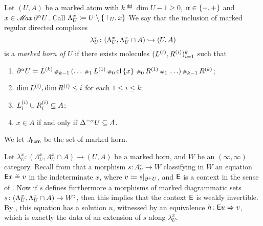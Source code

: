 \begin{dfn} 
    Let \( (U, A) \) be a marked atom with \( k \eqdef \dim U - 1 \geq 0 \), \( \a \in \set{-, +} \) and \( x \in \maxel{\bd{}{\a} U} \).
    Call \( \Lambda^x_U \eqdef U \setminus \set{\top_U, x} \)
    We say that the inclusion of marked regular directed complexes
    \begin{equation*}
        \lambda^x_U \colon (\Lambda^x_U, \Lambda^x_U \cap A) \incl (U, A) 
    \end{equation*}
    is a \emph{marked horn of \( U \)} if there exists molecules \( (\order{i}{L}, \order{i}{R})_{i = 1}^k \) such that
    \begin{enumerate}
        \item \( \bd{}{\a} U = \order{k}{L} \cp{k - 1} (\ldots \cp{1} \order{1}{L} \cp{0} \clset{x} \cp{0} \order{1}{R} \cp{1} \ldots) \cp{k - 1} \order{k}{R} \);
        \item \( \dim \order{i}{L}, \dim \order{i}{R} \le i \) for each \( 1 \le i \le k \);
        \item \( \gr{i}{\order{i}{L}} \cup \gr{i}{\order{i}{R}} \subseteq A \);
        \item \( x \in A \) if and only if \( \faces{}{-\a} U \subseteq A \).
    \end{enumerate}
    We let \( \Jhorn \) be the set of marked horn.
\end{dfn}

\begin{comm}
    Let \( \lambda^x_U \colon (\Lambda^x_U, \Lambda^x_U \cap A) \to (U, A) \) be a marked horn, and \( W \) be an \( (\infty, \infty) \)\nbd category.
    Recall from \cite[Comment 3.13]{chanavat2024model} that a morphism \( s \colon \Lambda^x_U \to W \) classifying in \( W \) an equation \( \fun{E}x \qeq v \) in the indeterminate \( x \), where \( v \eqdef \restr{s}{\bd{}{+}U} \), and \( \fun{E} \) is a context in the sense of \cite[3.1]{chanavat2024equivalences}.
    Now if \( s \) defines furthermore a morphisms of marked diagrammatic sets \( s \colon (\Lambda^x_U, \Lambda^x_U \cap A) \to \natmark{W} \), then this implies that the context \( \fun{E} \) is weakly invertible.
    By \cite[Lemma 5.10]{chanavat2024equivalences}, this equation has a solution \( u \), witnessed by an equivalence \( h \colon \fun{E}u \celto v \), which is exactly the data of an extension of \( s \) along \( \lambda^x_U \).
\end{comm}

